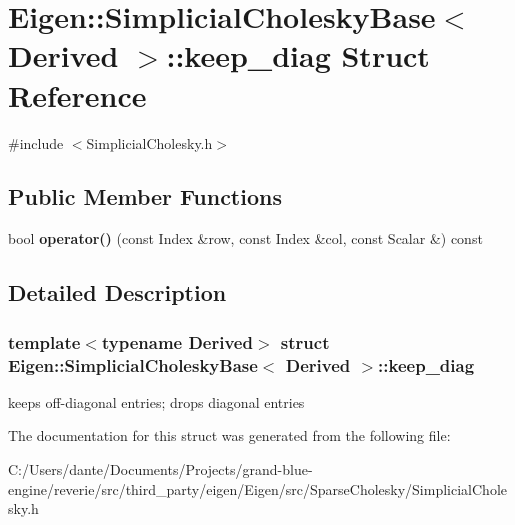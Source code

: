 \hypertarget{struct_eigen_1_1_simplicial_cholesky_base_1_1keep__diag}{}\section{Eigen\+::Simplicial\+Cholesky\+Base$<$ Derived $>$\+::keep\+\_\+diag Struct Reference}
\label{struct_eigen_1_1_simplicial_cholesky_base_1_1keep__diag}


{\ttfamily \#include $<$Simplicial\+Cholesky.\+h$>$}

\subsection*{Public Member Functions}
\begin{DoxyCompactItemize}
\item 
\mbox{\label{struct_eigen_1_1_simplicial_cholesky_base_1_1keep__diag_a3dfd9db46337c3497307c3940289c771}} 
bool {\bfseries operator()} (const Index \&row, const Index \&col, const Scalar \&) const
\end{DoxyCompactItemize}


\subsection{Detailed Description}
\subsubsection*{template$<$typename Derived$>$\newline
struct Eigen\+::\+Simplicial\+Cholesky\+Base$<$ Derived $>$\+::keep\+\_\+diag}

keeps off-\/diagonal entries; drops diagonal entries 

The documentation for this struct was generated from the following file\+:\begin{DoxyCompactItemize}
\item 
C\+:/\+Users/dante/\+Documents/\+Projects/grand-\/blue-\/engine/reverie/src/third\+\_\+party/eigen/\+Eigen/src/\+Sparse\+Cholesky/Simplicial\+Cholesky.\+h\end{DoxyCompactItemize}
